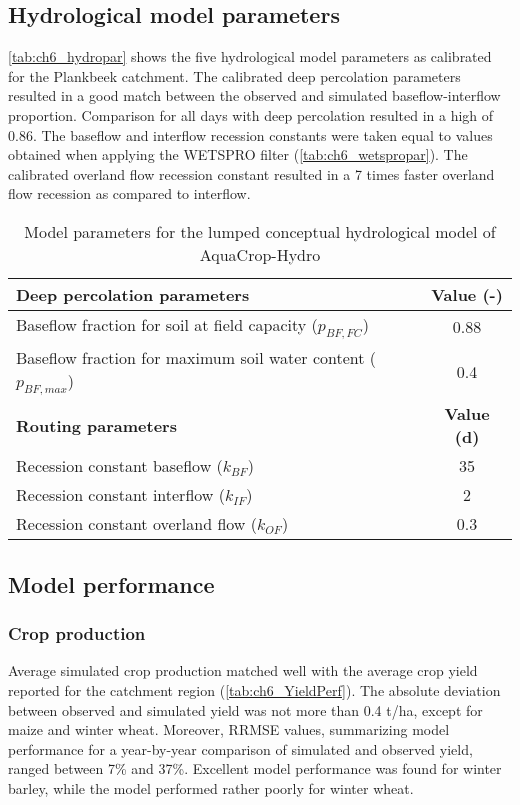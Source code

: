 \subsection{Hydrological model parameters}
\autoref{tab:ch6_hydropar} shows the five hydrological model parameters as calibrated for the Plankbeek catchment. The calibrated deep percolation parameters resulted in a good match between the observed and simulated baseflow-interflow proportion. Comparison for all days with deep percolation resulted in a high \Rsq of 0.86. The baseflow and interflow recession constants were taken equal to values obtained when applying the WETSPRO filter (\autoref{tab:ch6_wetspropar}). The calibrated overland flow recession constant resulted in a 7 times faster overland flow recession as compared to interflow.

\begin{table}[htbp]
\begin{tabularx}{\textwidth}{Xc}
  	\caption{Model parameters for the lumped conceptual hydrological model of AquaCrop-Hydro}\\
\toprule
\textbf{Deep percolation parameters} & \textbf{Value (-)} \\
\midrule
Baseflow fraction for soil at field capacity ($p_{BF,FC}$) & 0.88 \\
Baseflow fraction for maximum soil water content ($p_{BF,max}$) & 0.4 \\
\textbf{Routing parameters} & \textbf{Value (d)} \\
\midrule
Recession constant baseflow ($k_{BF}$) & 35 \\
Recession constant interflow ($k_{IF}$) & 2 \\
Recession constant overland flow ($k_{OF}$) & 0.3 \\
\bottomrule
\end{tabularx}%
  \label{tab:ch6_hydropar}%
  \end{table}

\subsection{Model performance}
\subsubsection{Crop production}
Average simulated crop production matched well with the average crop yield reported for the catchment region (\autoref{tab:ch6_YieldPerf}). The absolute deviation between observed and simulated yield was not more than 0.4 t/ha, except for maize and winter wheat. Moreover, RRMSE values, summarizing model performance for a year-by-year comparison of simulated and observed yield, ranged between 7\% and 37\%. Excellent model performance was found for winter barley, while the model performed rather poorly for winter wheat. 

